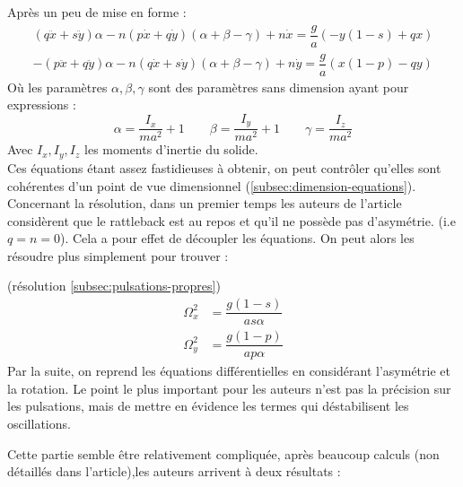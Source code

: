 \documentclass[12pt,a4paper]{article}
\begin{document}
	Après un peu de mise en forme : 
	\begin{align}
	\label{eq:equa-diff-couplées1}
	(q\ddot{x}+s\ddot{y})\alpha-n(p\dot{x}+q\dot{y})(\alpha+\beta-\gamma)+n\dot{x}=\dfrac{g}{a}(-y(1-s)+qx)\\
	\label{eq:equa-diff-couplées2}
	-(p\ddot{x}+q\ddot{y})\alpha-n(q\dot{x}+s\dot{y})(\alpha+\beta-\gamma)+n\dot{y}=\dfrac{g}{a}(x(1-p)-qy)
	\end{align}
	Où les paramètres $\alpha,\beta,\gamma$ sont des paramètres sans dimension ayant pour expressions :
	\begin{equation*}
	\alpha=\dfrac{I_x}{ma^2}+1\qquad \beta=\dfrac{I_y}{ma^2}+1\qquad  \gamma=\dfrac{I_z}{ma^2}
	\end{equation*}
	Avec $I_x,I_y,I_z$ les moments d'inertie du solide.\\
	Ces équations étant assez fastidieuses à obtenir, on peut contrôler qu'elles sont cohérentes d'un point de vue dimensionnel (\autoref{subsec:dimension-equations}).\\
	
	Concernant la résolution, dans un premier temps les auteurs de l'article considèrent que le rattleback est au repos et qu'il ne possède pas d'asymétrie. (i.e $q=n=0$). Cela a pour effet de découpler les équations. On peut alors les résoudre plus simplement pour trouver : 
	
	(résolution \autoref{subsec:pulsations-propres}) \\
	\begin{align}
	\Omega_x^2&=\dfrac{g(1-s)}{as\alpha}\\[2ex]
	\Omega_y^2&=\dfrac{g(1-p)}{ap\alpha}
	\end{align}
	Par la suite, on reprend les équations différentielles en considérant l'asymétrie et la rotation. Le point le plus important pour les auteurs n'est pas la précision sur les pulsations, mais de mettre en évidence les termes qui déstabilisent les oscillations.
	
	Cette partie semble être relativement compliquée, après beaucoup calculs (non détaillés dans l'article),les auteurs arrivent à deux résultats :
\end{document}
